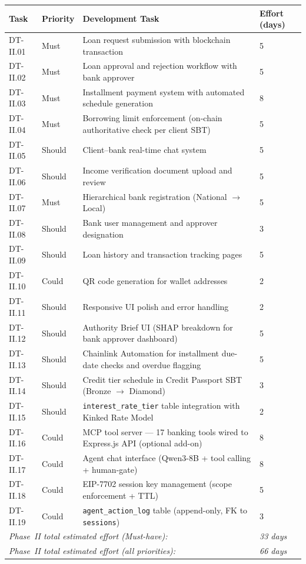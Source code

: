 \documentclass[12pt, a4paper]{report}
\newcommand{\tableheadcolor}{\rowcolor{TableHeadBg}}
\begin{document}
\begin{table}[H]
\centering
\begin{tabular}{p{1.8cm}p{1.8cm}p{7.5cm}p{1.5cm}}
\toprule
\tableheadcolor
\textbf{Task} & \textbf{Priority} & \textbf{Development Task} & \textbf{Effort (days)} \\
\midrule
DT-II.01 & Must & Loan request submission with blockchain transaction & 5 \\
DT-II.02 & Must & Loan approval and rejection workflow with bank approver & 5 \\
DT-II.03 & Must & Installment payment system with automated schedule generation & 8 \\
DT-II.04 & Must & Borrowing limit enforcement (on-chain authoritative check per client SBT) & 5 \\
DT-II.05 & Should & Client--bank real-time chat system & 5 \\
DT-II.06 & Should & Income verification document upload and review & 5 \\
DT-II.07 & Must & Hierarchical bank registration (National $\to$ Local) & 5 \\
DT-II.08 & Should & Bank user management and approver designation & 3 \\
DT-II.09 & Should & Loan history and transaction tracking pages & 5 \\
DT-II.10 & Could & QR code generation for wallet addresses & 2 \\
DT-II.11 & Should & Responsive UI polish and error handling & 2 \\
DT-II.12 & Should & Authority Brief UI (SHAP breakdown for bank approver dashboard) & 5 \\
DT-II.13 & Should & Chainlink Automation for installment due-date checks and overdue flagging & 5 \\
DT-II.14 & Should & Credit tier schedule in Credit Passport SBT (Bronze $\to$ Diamond) & 3 \\
DT-II.15 & Should & \texttt{interest\_rate\_tier} table integration with Kinked Rate Model & 2 \\
DT-II.16 & Could & MCP tool server --- 17 banking tools wired to Express.js API (optional add-on) & 8 \\
DT-II.17 & Could & Agent chat interface (Qwen3-8B + tool calling + human-gate) & 8 \\
DT-II.18 & Could & EIP-7702 session key management (scope enforcement + TTL) & 5 \\
DT-II.19 & Could & \texttt{agent\_action\_log} table (append-only, FK to \texttt{sessions}) & 3 \\
\multicolumn{3}{l}{\textit{Phase~II total estimated effort (Must-have):}} & \textit{33 days} \\
\multicolumn{3}{l}{\textit{Phase~II total estimated effort (all priorities):}} & \textit{66 days} \\
\bottomrule
\end{tabular}
\end{table}
\end{document}
